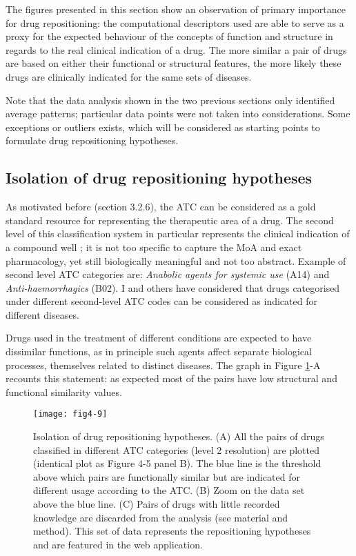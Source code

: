 The figures presented in this section show an observation of primary importance for drug repositioning: the computational descriptors used are able to serve as a proxy for the expected behaviour of the concepts of function and structure in regards to the real clinical indication of a drug. The more similar a pair of drugs are based on either their functional or structural features, the more likely these drugs are clinically indicated for the same sets of diseases.

Note that the data analysis shown in the two previous sections only identified average patterns; particular data points were not taken into considerations. Some exceptions or outliers exists, which will be considered as starting points to formulate drug repositioning hypotheses.

\subsection{Isolation of drug repositioning hypotheses}
As motivated before (section 3.2.6), the ATC can be considered as a gold standard resource for representing the therapeutic area of a drug. The second level of this classification system in particular represents the clinical indication of a compound well \citep{world2006anatomical}; it is not too specific to capture the MoA and exact pharmacology, yet still biologically meaningful and not too abstract. Example of second level ATC categories are: \emph{Anabolic agents for systemic use} (A14) and \emph{Anti-haemorrhagics} (B02). I and others \citep{campillos2008drug} \citep{napolitano2013drug} have considered that drugs categorised under different second-level ATC codes can be considered as indicated for different diseases.

Drugs used in the treatment of different conditions are expected to have dissimilar functions, as in principle such agents affect separate biological processes, themselves related to distinct diseases. The graph in Figure \ref{fig4-9}-A recounts this statement: as expected most of the pairs have low structural and functional similarity values.

\begin{figure}[ht]
    \centering
    \texttt{[image: fig4-9]}
    \caption{Isolation of drug repositioning hypotheses. (A) All the pairs of drugs classified in different ATC categories (level 2 resolution) are plotted (identical plot as Figure 4-5 panel B). The blue line is the threshold above which pairs are functionally similar but are indicated for different usage according to the ATC. (B) Zoom on the data set above the blue line. (C) Pairs of drugs with little recorded knowledge are discarded from the analysis (see material and method). This set of data represents the repositioning hypotheses and are featured in the web application.}
    \label{fig4-9}
\end{figure}

